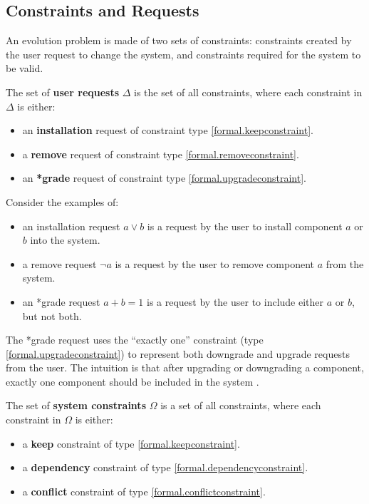 \subsection{Constraints and Requests}
\label{formal.constraints}
An evolution problem is made of two sets of constraints: constraints created by the user request to change the system, 
and constraints required for the system to be valid.

\begin{defs}
The set of \textbf{user requests} $\Delta$ is the set of all constraints, where each constraint in $\Delta$ is either:
\begin{itemize}
  \item an \textbf{installation} request of constraint type \ref{formal.keepconstraint}.
  \item a \textbf{remove} request of constraint type \ref{formal.removeconstraint}.
  \item an \textbf{*grade} request of constraint type \ref{formal.upgradeconstraint}.
\end{itemize}
\end{defs}

Consider the examples of:
\begin{itemize}
  \item an installation request $a \vee b$ is a request by the user to install component $a$ or $b$ into the system.
  \item a remove request $\neg a$ is a request by the user to remove component $a$ from the system.
  \item an *grade request $a + b = 1$ is a request by the user to include either $a$ or $b$, but not both.
\end{itemize} 

The *grade request uses the ``exactly one'' constraint (type \ref{formal.upgradeconstraint}) to represent both downgrade and upgrade requests from the user.
The intuition is that after upgrading or downgrading a component, exactly one component should be included in the system \citep{treinen2009common}.

\begin{defs}
The set of \textbf{system constraints} $\Omega$ is a set of all constraints, where each constraint in $\Omega$ is either: 
\begin{itemize}
  \item a \textbf{keep} constraint of type \ref{formal.keepconstraint}.
  \item a \textbf{dependency} constraint of type \ref{formal.dependencyconstraint}.
  \item a \textbf{conflict} constraint of type \ref{formal.conflictconstraint}.
\end{itemize}
\end{defs}

